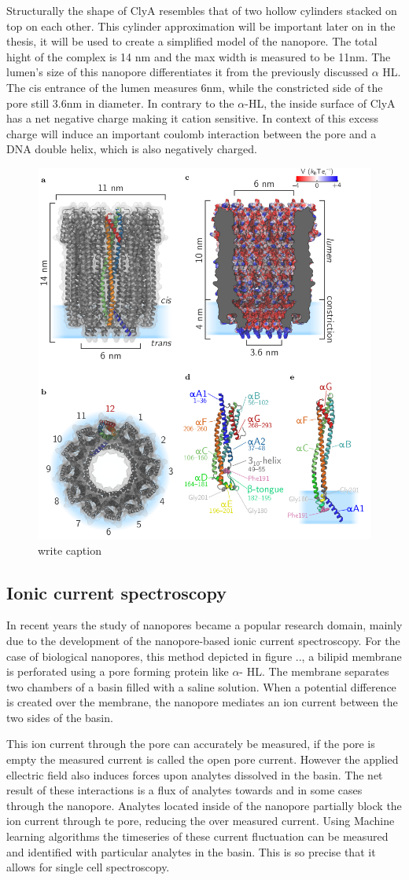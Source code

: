 Structurally the shape of ClyA resembles that of two hollow cylinders stacked on top on
each other. This cylinder approximation will be important later on in the thesis, it will
be used to create a simplified model of the nanopore. The total hight of the complex is
14 nm and the max width is measured to be 11nm. The lumen's size of this nanopore
differentiates it from the previously discussed $\alpha$ HL. The cis entrance of the
lumen measures 6nm, while the constricted side of the pore still 3.6nm in diameter. In
contrary to the $\alpha$-HL, the inside surface of ClyA has a net negative charge
making it cation sensitive. In context of this excess charge will induce an important
 coulomb interaction between the pore and a DNA double helix, which is also negatively
 charged.


\begin{figure}[h!]
  \centering
  \includegraphics[width=0.5\linewidth]{Figures/cytolysinA.png}
  \caption{write caption}
  \label{adassf}
\end{figure}

\subsection{Ionic current spectroscopy}
In recent years the study of nanopores became a popular research domain, mainly
due to the development of the nanopore-based ionic current spectroscopy. For the case of
biological nanopores, this method depicted in figure .., a bilipid membrane is perforated
using a pore forming protein like $\alpha$- HL. The membrane separates two chambers of
a basin filled with a saline solution. When a potential difference is created over
the membrane, the nanopore mediates an ion current between the two sides of the basin.

This ion current through the pore can accurately be measured, if the pore is empty the
measured current is called the open pore current. However the applied ellectric field
also induces forces upon analytes dissolved in the basin. The net result of these
interactions is a flux of analytes towards and in some cases through the nanopore.
Analytes located inside of the nanopore partially block the ion current through te pore,
reducing the over measured current. Using Machine learning algorithms the timeseries of
these current fluctuation can be measured and identified with particular analytes in the
basin. This is so precise that it allows for single cell spectroscopy.

